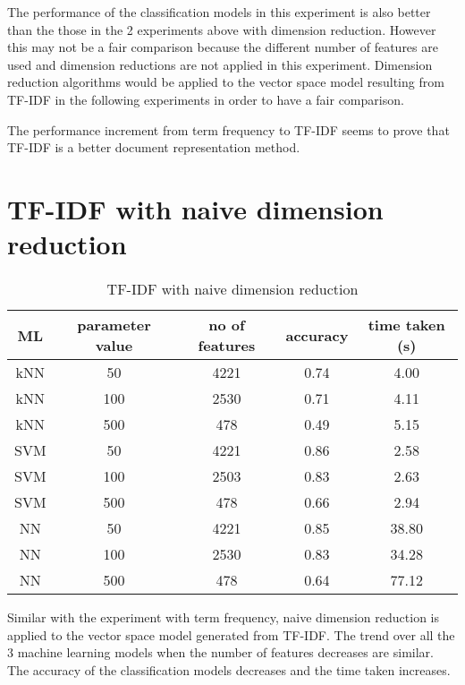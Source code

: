 The performance of the classification models in this experiment is also better than the those in the 2 experiments above with dimension reduction. However this may not be a fair comparison because the different number of features are used and dimension reductions are not applied in this experiment. Dimension reduction algorithms would be applied to the vector space model resulting from TF-IDF in the following experiments in order to have a fair comparison.

The performance increment from term frequency to TF-IDF seems to prove that TF-IDF is a better document representation method.\\

\clearpage
\section{TF-IDF with naive dimension reduction}

\begin{table} [ht]
	\centering
	\begin{tabular}{|| c | c | c | c | c||}
		\hline
		ML & parameter value & no of features & accuracy & time taken (s) \\ [0.5ex]
		\hline\hline
		kNN & 50 & 4221 & 0.74 & 4.00 \\ 
		\hline
		kNN & 100 & 2530 & 0.71 & 4.11 \\ 
		\hline
		kNN & 500 & 478 & 0.49 & 5.15 \\ 
		\hline\hline
		SVM & 50 & 4221 & 0.86 & 2.58 \\
		\hline
		SVM & 100 & 2503 & 0.83 & 2.63 \\
		\hline
		SVM & 500 & 478 & 0.66 & 2.94 \\
		\hline\hline
		NN & 50 & 4221 & 0.85 & 38.80 \\
		\hline
		NN & 100 & 2530 & 0.83 & 34.28 \\
		\hline
		NN & 500 & 478 & 0.64 & 77.12 \\
		\hline
	\end{tabular}
\caption{TF-IDF with naive dimension reduction}
\label{tbl:tfidfNaive}
\end{table}

Similar with the experiment with term frequency, naive dimension reduction is applied to the vector space model generated from TF-IDF. The trend over all the 3 machine learning models when the number of features decreases are similar. The accuracy of the classification models decreases and the time taken increases. 

